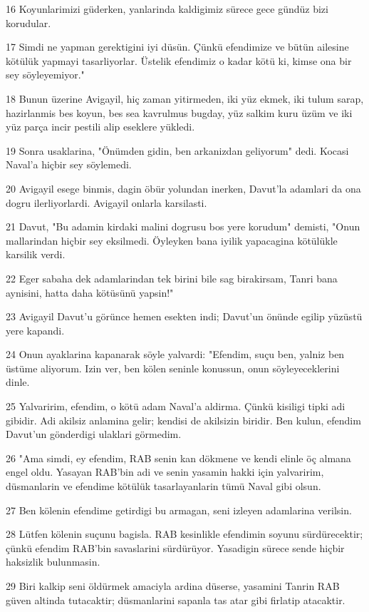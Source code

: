 \par 16 Koyunlarimizi güderken, yanlarinda kaldigimiz sürece gece gündüz bizi korudular.
\par 17 Simdi ne yapman gerektigini iyi düsün. Çünkü efendimize ve bütün ailesine kötülük yapmayi tasarliyorlar. Üstelik efendimiz o kadar kötü ki, kimse ona bir sey söyleyemiyor."
\par 18 Bunun üzerine Avigayil, hiç zaman yitirmeden, iki yüz ekmek, iki tulum sarap, hazirlanmis bes koyun, bes sea kavrulmus bugday, yüz salkim kuru üzüm ve iki yüz parça incir pestili alip eseklere yükledi.
\par 19 Sonra usaklarina, "Önümden gidin, ben arkanizdan geliyorum" dedi. Kocasi Naval'a hiçbir sey söylemedi.
\par 20 Avigayil esege binmis, dagin öbür yolundan inerken, Davut'la adamlari da ona dogru ilerliyorlardi. Avigayil onlarla karsilasti.
\par 21 Davut, "Bu adamin kirdaki malini dogrusu bos yere korudum" demisti, "Onun mallarindan hiçbir sey eksilmedi. Öyleyken bana iyilik yapacagina kötülükle karsilik verdi.
\par 22 Eger sabaha dek adamlarindan tek birini bile sag birakirsam, Tanri bana aynisini, hatta daha kötüsünü yapsin!"
\par 23 Avigayil Davut'u görünce hemen esekten indi; Davut'un önünde egilip yüzüstü yere kapandi.
\par 24 Onun ayaklarina kapanarak söyle yalvardi: "Efendim, suçu ben, yalniz ben üstüme aliyorum. Izin ver, ben kölen seninle konussun, onun söyleyeceklerini dinle.
\par 25 Yalvaririm, efendim, o kötü adam Naval'a aldirma. Çünkü kisiligi tipki adi gibidir. Adi akilsiz anlamina gelir; kendisi de akilsizin biridir. Ben kulun, efendim Davut'un gönderdigi ulaklari görmedim.
\par 26 "Ama simdi, ey efendim, RAB senin kan dökmene ve kendi elinle öç almana engel oldu. Yasayan RAB'bin adi ve senin yasamin hakki için yalvaririm, düsmanlarin ve efendime kötülük tasarlayanlarin tümü Naval gibi olsun.
\par 27 Ben kölenin efendime getirdigi bu armagan, seni izleyen adamlarina verilsin.
\par 28 Lütfen kölenin suçunu bagisla. RAB kesinlikle efendimin soyunu sürdürecektir; çünkü efendim RAB'bin savaslarini sürdürüyor. Yasadigin sürece sende hiçbir haksizlik bulunmasin.
\par 29 Biri kalkip seni öldürmek amaciyla ardina düserse, yasamini Tanrin RAB güven altinda tutacaktir; düsmanlarini sapanla tas atar gibi firlatip atacaktir.
